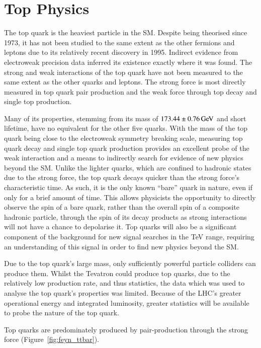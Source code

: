 \section{Top Physics}\label{sec:top-physics}

The top quark is the heaviest particle in the SM. Despite being theorised since 1973, it has not been studied to the same extent as the other fermions and leptons due to its relatively recent discovery in 1995. 
Indirect evidence from electroweak precision data inferred its existence exactly where it was found. 
The strong and weak interactions of the top quark have not been measured to the same extent as the other quarks and leptons.
The strong force is most directly measured in top quark pair production and the weak force through top decay and single top production. 

Many of its properties, stemming from its mass  of $173.44 \pm 0.76 \,\text{Ge\hspace{-.08em}V}$ and short lifetime, have no equivalent for the other five quarks. 
With the mass of the top quark being close to the electroweak symmetry breaking scale, measuring top quark decay and single top quark production provides an excellent probe of the weak interaction and a means to indirectly search for evidence of new physics beyond the SM. 
Unlike the lighter quarks, which are confined to hadronic states due to the strong force, the top quark decays quicker than the strong force’s characteristic time.
As such, it is the only known ``bare'' quark in nature, even if only for a brief amount of time. 
This allows physicists the opportunity to directly observe the spin of a bare quark, rather than the overall spin of a composite hadronic particle, through the spin of its decay products as strong interactions will not have a chance to depolarise it.
Top quarks will also be a significant component of the background for new signal searches in the TeV range, requiring an understanding of this signal in order to find new physics beyond the SM.

Due to the top quark’s large mass, only sufficiently powerful particle colliders can produce them. 
Whilst the Tevatron could produce top quarks, due to the relatively low production rate, and thus statistics, the data which was used to analyse the top quark’s properties was limited.
Because of the LHC’s greater operational energy and integrated luminosity, greater statistics will be available to probe the nature of the top quark. 

Top quarks are predominately produced by pair-production through the strong force (Figure~\ref{fig:feyn_ttbar}).

